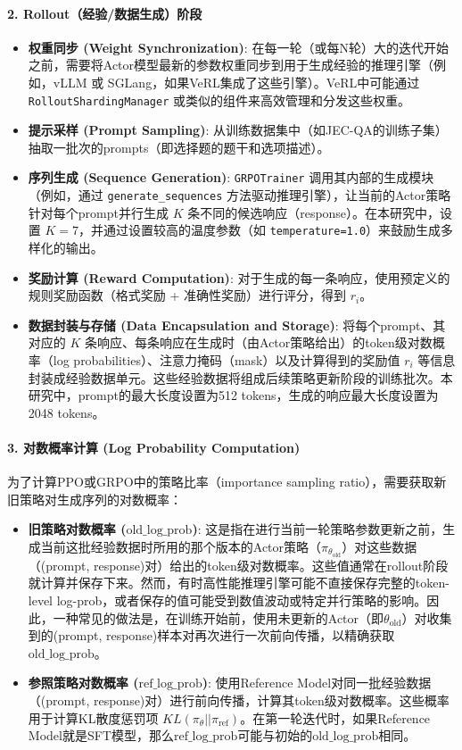 \documentclass{pkuthesis}
\begin{document}
\paragraph{2. Rollout（经验/数据生成）阶段}
\begin{itemize}
    \item \textbf{权重同步 (Weight Synchronization)}: 在每一轮（或每N轮）大的迭代开始之前，需要将Actor模型最新的参数权重同步到用于生成经验的推理引擎（例如，vLLM 或 SGLang，如果VeRL集成了这些引擎）。VeRL中可能通过 \texttt{RolloutShardingManager} 或类似的组件来高效管理和分发这些权重。
    \item \textbf{提示采样 (Prompt Sampling)}: 从训练数据集中（如JEC-QA的训练子集）抽取一批次的prompts（即选择题的题干和选项描述）。
    \item \textbf{序列生成 (Sequence Generation)}: \texttt{GRPOTrainer} 调用其内部的生成模块（例如，通过 \texttt{generate\_sequences} 方法驱动推理引擎），让当前的Actor策略针对每个prompt并行生成 $K$ 条不同的候选响应（response）。在本研究中，设置 $K=7$，并通过设置较高的温度参数（如 \texttt{temperature=1.0}）来鼓励生成多样化的输出。
    \item \textbf{奖励计算 (Reward Computation)}: 对于生成的每一条响应，使用预定义的规则奖励函数（格式奖励 + 准确性奖励）进行评分，得到 $r_i$。
    \item \textbf{数据封装与存储 (Data Encapsulation and Storage)}: 将每个prompt、其对应的 $K$ 条响应、每条响应在生成时（由Actor策略给出）的token级对数概率（log probabilities）、注意力掩码（mask）以及计算得到的奖励值 $r_i$ 等信息封装成经验数据单元。这些经验数据将组成后续策略更新阶段的训练批次。本研究中，prompt的最大长度设置为512 tokens，生成的响应最大长度设置为2048 tokens。
\end{itemize}

\paragraph{3. 对数概率计算 (Log Probability Computation)}
为了计算PPO或GRPO中的策略比率（importance sampling ratio），需要获取新旧策略对生成序列的对数概率：
\begin{itemize}
    \item \textbf{旧策略对数概率 ($\text{old\_log\_prob}$)}: 这是指在进行当前一轮策略参数更新之前，生成当前这批经验数据时所用的那个版本的Actor策略（$\pi_{\theta_{\text{old}}}$）对这些数据（(prompt, response)对）给出的token级对数概率。这些值通常在rollout阶段就计算并保存下来。然而，有时高性能推理引擎可能不直接保存完整的token-level log-prob，或者保存的值可能受到数值波动或特定并行策略的影响。因此，一种常见的做法是，在训练开始前，使用未更新的Actor（即$\theta_{\text{old}}$）对收集到的(prompt, response)样本对再次进行一次前向传播，以精确获取$\text{old\_log\_prob}$。
    \item \textbf{参照策略对数概率 ($\text{ref\_log\_prob}$)}: 使用Reference Model对同一批经验数据（(prompt, response)对）进行前向传播，计算其token级对数概率。这些概率用于计算KL散度惩罚项 $KL(\pi_{\theta} || \pi_{\text{ref}})$。在第一轮迭代时，如果Reference Model就是SFT模型，那么$\text{ref\_log\_prob}$可能与初始的$\text{old\_log\_prob}$相同。
\end{itemize}
\end{document}
